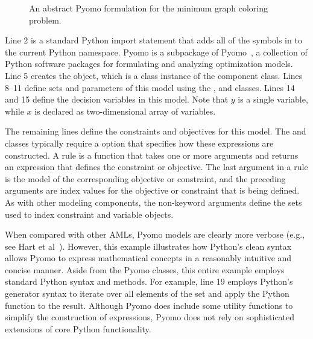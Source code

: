 \begin{figure}[htbp]

\caption{\label{fig:intro:min-graph-coloring}An abstract Pyomo formulation for the minimum graph coloring problem.}
\end{figure}

Line 2 is a standard Python import statement that adds
all of the symbols in  to the current Python
namespace.  Pyomo is a subpackage of Pyomo~\cite{Pyomo}, a
collection of Python software packages for formulating and analyzing
optimization models.  Line 5 creates the 
object, which is a class instance of the 
component
class. Lines 8--11 define sets and parameters
of this model using the ,
 and
 classes. Lines 14 and 15 define the
decision variables in this model.  Note that $y$ is a single variable,
while $x$ is declared as two-dimensional array of variables.

The remaining lines define the constraints and objectives for this model.
The  and  classes typically require a
 option that specifies how these expressions are constructed.
A rule is a function that takes one or more arguments and returns an
expression that defines the constraint or objective. The last argument
in a rule is the model of the corresponding objective or constraint, and
the preceding arguments are index values for the objective or constraint
that is being defined.  As with other modeling components, the non-keyword
arguments define the sets used to index constraint and variable objects.

When compared with other AMLs, Pyomo models are clearly more verbose
(e.g., see Hart et al~\cite{hartetal11}).  However, this example
illustrates how Python's clean syntax allows Pyomo to express mathematical
concepts in a reasonably intuitive and concise manner.  Aside from
the Pyomo classes, this entire example employs standard Python syntax
and methods.  For example, line 19 employs Python's generator syntax to
iterate over all elements of the  set and apply the Python
 function to the result.  Although Pyomo does include some
utility functions to simplify the construction of expressions, Pyomo
does not rely on sophisticated extensions of core Python functionality.


